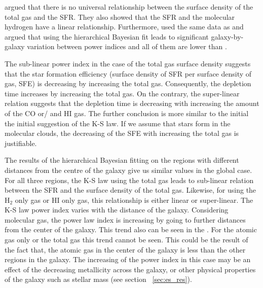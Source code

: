 \documentclass[useAMS,usenatbib]{mn2e}
\begin{document}
 \cite{Bigiel08} argued that there is no universal relationship between the surface density of the total gas and the SFR. They also showed that the SFR and the molecular hydrogen have a linear relationship. Furthermore, \cite{Shetty13} used the same data as \cite{Bigiel08} and argued that using the hierarchical Bayesian fit leads to significant galaxy-by-galaxy variation between power indices and all of them are lower than \cite{Bigiel08}. 

The sub-linear power index in the case of the total gas surface density suggests that the star formation efficiency (surface density of SFR per surface density of gas, SFE) is decreasing by increasing the total gas. Consequently, the depletion time increases by increasing the total gas. On the contrary, the super-linear relation suggests that the depletion time is decreasing with increasing the amount of the CO or/ and HI gas. The further conclusion is more similar to the initial the initial suggestion of the K-S law. %
If we assume that stars form in the molecular clouds, the decreasing of the SFE with increasing the total gas is justifiable.  

The results of the hierarchical Bayesian fitting on the regions with different distances from the centre of the galaxy give us similar values in the global case. For all three regions, the K-S law using the total gas leads to sub-linear relation between the SFR and the surface density of the total gas. Likewise, for using the H$_{2}$ only gas or HI only gas, this relationship is either linear or super-linear. The K-S law power index varies with the distance of the galaxy. Considering molecular gas, the power law index is increasing by going to further distances from the center of the galaxy. This trend also can be seen in the \cite{Ford13}. For the atomic gas only or the total gas this trend cannot be seen. This could be the result of the fact that, the atomic gas in the center of the galaxy is less than the other regions in the galaxy. 
The increasing of the power index in this case may be an effect of the decreasing metallicity across the galaxy, or other physical properties of the galaxy such as stellar mass (see section ~\ref{sec:es_res}).
  
\end{document}
